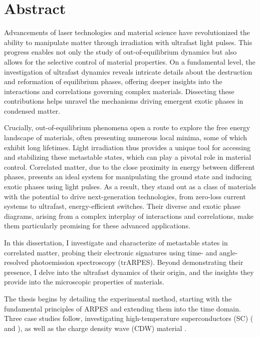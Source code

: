 

\cleardoublepage
\chapter*{Abstract}
Advancements of laser technologies and material science have revolutionized the ability to manipulate matter through irradiation with ultrafast light pulses.
This progress enables not only the study of out-of-equilibrium dynamics but also allows for the selective control of material properties.
On a fundamental level, the investigation of ultrafast dynamics reveals intricate details about the destruction and reformation of equilibrium phases, offering deeper insights into the interactions and correlations governing complex materials.
Dissecting these contributions helps unravel the mechanisms driving emergent exotic phases in condensed matter.

Crucially, out-of-equilibrium phenomena open a route to explore the free energy landscape of materials, often presenting numerous local minima, some of which exhibit long lifetimes.
Light irradiation thus provides a unique tool for accessing and stabilizing these metastable states, which can play a pivotal role in material control.
Correlated matter, due to the close proximity in energy between different phases, presents an ideal system for manipulating the ground state and inducing exotic phases using light pulses.
As a result, they stand out as a class of materials with the potential to drive next-generation technologies, from zero-loss current systems to ultrafast, energy-efficient switches.
Their diverse and exotic phase diagrams, arising from a complex interplay of interactions and correlations, make them particularly promising for these advanced applications.\hfill\break

In this dissertation, I investigate and characterize of metastable states in correlated matter, probing their electronic signatures using time- and angle-resolved photoemission spectroscopy (trARPES).
Beyond demonstrating their presence, I delve into the ultrafast dynamics of their origin, and the insights they provide into the microscopic properties of materials.\hfill\break

The thesis begins by detailing the experimental method, starting with the fundamental principles of ARPES and extending them into the time domain.
Three case studies follow, investigating high-temperature superconductors (SC) ( and ), as well as the charge density wave (CDW) material .

